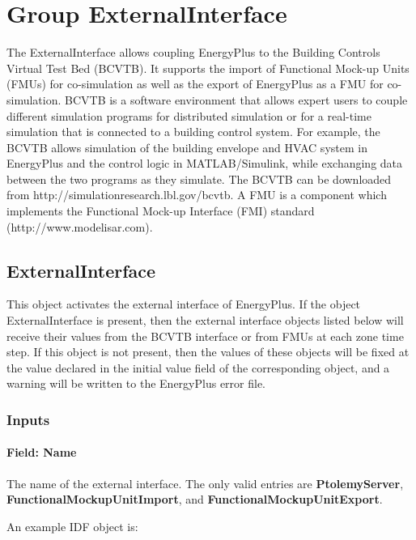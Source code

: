 \section{Group ExternalInterface}\label{group-externalinterface}

The ExternalInterface allows coupling EnergyPlus to the Building Controls Virtual Test Bed (BCVTB). It supports the import of Functional Mock-up Units (FMUs) for co-simulation as well as the export of EnergyPlus as a FMU for co-simulation. BCVTB is a software environment that allows expert users to couple different simulation programs for distributed simulation or for a real-time simulation that is connected to a building control system. For example, the BCVTB allows simulation of the building envelope and HVAC system in EnergyPlus and the control logic in MATLAB/Simulink, while exchanging data between the two programs as they simulate. The BCVTB can be downloaded from http://simulationresearch.lbl.gov/bcvtb. A FMU is a component which implements the Functional Mock-up Interface (FMI) standard (http://www.modelisar.com).

\subsection{ExternalInterface}\label{externalinterface}

This object activates the external interface of EnergyPlus. If the object ExternalInterface is present, then the external interface objects listed below will receive their values from the BCVTB interface or from FMUs at each zone time step. If this object is not present, then the values of these objects will be fixed at the value declared in the initial value field of the corresponding object, and a warning will be written to the EnergyPlus error file.

\subsubsection{Inputs}\label{inputs-018}

\paragraph{Field: Name}\label{field-name-017}

The name of the external interface. The only valid entries are \textbf{PtolemyServer}, \textbf{FunctionalMockupUnitImport}, and \textbf{FunctionalMockupUnitExport}.

An example IDF object is:

